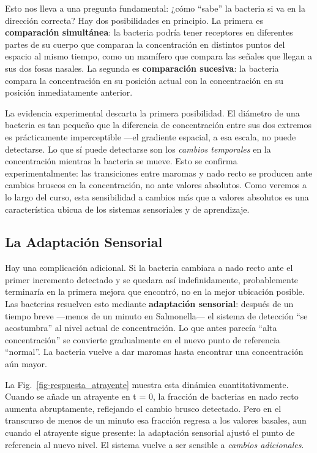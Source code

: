 \documentclass[
  letterpaper,
  DIV=11,
  numbers=noendperiod]{scrreprt}
\begin{document}
Esto nos lleva a una pregunta fundamental: ¿cómo ``sabe'' la bacteria si
va en la dirección correcta? Hay dos posibilidades en principio. La
primera es \textbf{comparación simultánea}: la bacteria podría tener
receptores en diferentes partes de su cuerpo que comparan la
concentración en distintos puntos del espacio al mismo tiempo, como un
mamífero que compara las señales que llegan a sus dos fosas nasales. La
segunda es \textbf{comparación sucesiva}: la bacteria compara la
concentración en su posición actual con la concentración en su posición
inmediatamente anterior.

La evidencia experimental descarta la primera posibilidad. El diámetro
de una bacteria es tan pequeño que la diferencia de concentración entre
sus dos extremos es prácticamente imperceptible ---el gradiente
espacial, a esa escala, no puede detectarse. Lo que sí puede detectarse
son los \emph{cambios temporales} en la concentración mientras la
bacteria se mueve. Esto se confirma experimentalmente: las transiciones
entre maromas y nado recto se producen ante cambios bruscos en la
concentración, no ante valores absolutos. Como veremos a lo largo del
curso, esta sensibilidad a cambios más que a valores absolutos es una
característica ubicua de los sistemas sensoriales y de aprendizaje.

\subsection{La Adaptación Sensorial}\label{la-adaptaciuxf3n-sensorial}

Hay una complicación adicional. Si la bacteria cambiara a nado recto
ante el primer incremento detectado y se quedara así indefinidamente,
probablemente terminaría en la primera mejora que encontró, no en la
mejor ubicación posible. Las bacterias resuelven esto mediante
\textbf{adaptación sensorial}: después de un tiempo breve ---menos de un
minuto en Salmonella--- el sistema de detección ``se acostumbra'' al
nivel actual de concentración. Lo que antes parecía ``alta
concentración'' se convierte gradualmente en el nuevo punto de
referencia ``normal''. La bacteria vuelve a dar maromas hasta encontrar
una concentración aún mayor.

La Fig.~\ref{fig-respuesta_atrayente} muestra esta dinámica
cuantitativamente. Cuando se añade un atrayente en t = 0, la fracción de
bacterias en nado recto aumenta abruptamente, reflejando el cambio
brusco detectado. Pero en el transcurso de menos de un minuto esa
fracción regresa a los valores basales, aun cuando el atrayente sigue
presente: la adaptación sensorial ajustó el punto de referencia al nuevo
nivel. El sistema vuelve a ser sensible a \emph{cambios adicionales}.
\end{document}
